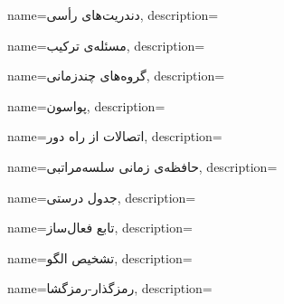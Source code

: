 {
name={دندریت‌های رأسی},
description=\hfill{}
}

{
	name={مسئله‌ی ترکیب},
	description=\hfill{}
}

{
name={گروه‌های چند‌زمانی},
description=\hfill{}
}


{
	name={پواسون},
	description=\hfill{}
}


{
	name={اتصالات از راه دور},
	description=\hfill{}
}

{
	name={حافظه‌ی زمانی سلسه‌مراتبی},
	description=\hfill{}
}

{
	name={جدول درستی},
	description=\hfill{}
}

{
	name={تابع فعال‌ساز},
	description=\hfill{}
}

{
	name={تشخیص الگو},
	description=\hfill{}
}


{
	name={رمزگذار-رمزگشا},
	description=\hfill{}
}


